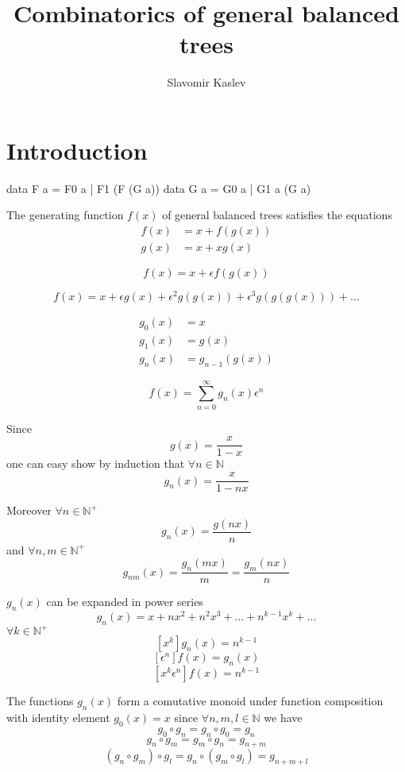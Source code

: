 \documentclass[a4paper]{article}
\title{Combinatorics of general balanced trees}
\author{Slavomir Kaslev}
\begin{document}
\maketitle

\section{Introduction}

\begin{code}
  data F a = F0 a | F1 (F (G a))
  data G a = G0 a | G1 a (G a)
\end{code}

The generating function $f(x)$ of general balanced trees satisfies the equations
\begin{align*}
  f(x) &= x + f(g(x)) \\
  g(x) &= x + x g(x)
\end{align*}

\begin{equation}
  f(x) = x + \epsilon f(g(x))\label{eq:eq1}
\end{equation}

$$f(x) = x + \epsilon g(x) + \epsilon^2 g(g(x)) + \epsilon^3 g(g(g(x))) + \dots$$

\begin{align*}
g_0(x) &= x\\
g_1(x) &= g(x)\\
g_n(x) &= g_{n-1}(g(x))
\end{align*}

\begin{equation}
f(x) = \sum_{n=0}^{\infty}{g_n(x)} \epsilon^n
\end{equation}


Since
\begin{equation}
  g(x) = \frac{x}{1-x}
\end{equation}
one can easy show by induction that $\forall n \in \mathbb{N}$
$$g_n(x) = \frac{x}{1 - n x}$$

Moreover $\forall n \in \mathbb{N}^+$
$$g_n(x) = \frac{g(n x)}{n} $$
and $\forall n,m \in \mathbb{N}^{+}$
$$g_{nm}(x) = \frac{g_n(m x)}{m} = \frac{g_m(n x)}{n}$$

$g_n(x)$ can be expanded in power series
$$g_n(x) = x + n x^2 + n^2 x^3 + \dots + n^{k-1}x^k + \dots$$
$\forall k \in \mathbb{N}^{+}$
$$[x^k] g_n(x) = n^{k-1}$$
$$[\epsilon^n] f(x) = g_n(x)$$
$$[x^k\epsilon^n] f(x) = n^{k-1}$$

The functions $g_n(x)$ form a comutative monoid under function composition
with identity element $g_0(x) = x$ since $\forall n, m, l\in \mathbb{N}$ we have
$$g_0 \circ g_n = g_n \circ g_0 = g_n$$
$$g_n \circ g_m = g_m \circ g_n = g_{n+m}$$
$$(g_n \circ g_m) \circ g_l = g_n \circ (g_m \circ g_l) = g_{n+m+l}$$
\end{document}
